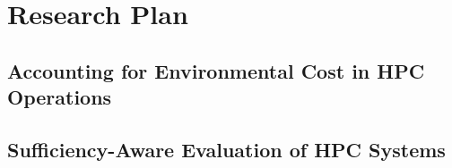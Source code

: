 \chapter{Research Plan}
\label{ch:plan}

\section{Accounting for Environmental Cost in HPC Operations}
\label{sec:plan-operations}

\section{Sufficiency-Aware Evaluation of HPC Systems}
\label{sec:plan-evaluation}
